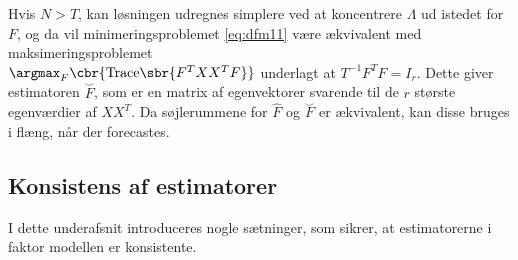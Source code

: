 Hvis \(N > T\), kan løsningen udregnes simplere ved at koncentrere \(\Lambda\) ud istedet for \(F\), og da vil minimeringsproblemet \eqref{eq:dfm11} være ækvivalent med maksimeringsproblemet \\
\(\argmax_F \cbr{ \text{Trace} \sbr{ F^T X X^T F}}\) underlagt at \(T^{-1} F^T F = I_r\).
Dette giver estimatoren \(\overset{\smile}{F}\), som er en matrix af egenvektorer svarende til de \(r\) største egenværdier af \(X X^T\).
Da søjlerummene for \(\widehat{F}\) og \(\overset{\smile}{F}\) er ækvivalent, kan disse bruges i flæng, når der forecastes.
%

\subsection{Konsistens af estimatorer}
I dette underafsnit introduceres nogle sætninger, som sikrer, at estimatorerne i faktor modellen er konsistente.

